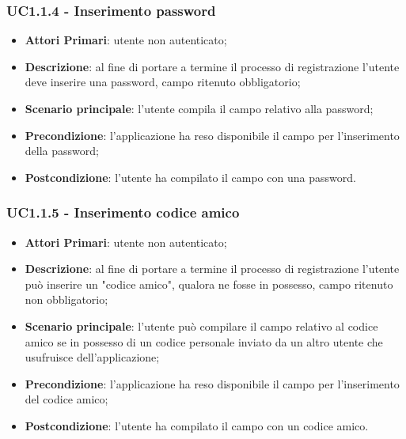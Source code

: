 \subsubsection{UC1.1.4 - Inserimento password}
\begin{itemize}
	\item \textbf{Attori Primari}: utente non autenticato;
	\item \textbf{Descrizione}: al fine di portare a termine il processo di registrazione l'utente deve inserire una password, campo ritenuto obbligatorio;
	\item \textbf{Scenario principale}: l'utente compila il campo relativo alla password;	
	\item \textbf{Precondizione}: l'applicazione ha reso disponibile il campo per l'inserimento della password;
	\item \textbf{Postcondizione}: l'utente ha compilato il campo con una password.
\end{itemize}

\subsubsection{UC1.1.5 - Inserimento codice amico}
\begin{itemize}
	\item \textbf{Attori Primari}: utente non autenticato;
	\item \textbf{Descrizione}: al fine di portare a termine il processo di registrazione l'utente può inserire un "codice amico", qualora ne fosse in possesso, campo ritenuto non obbligatorio;
	\item \textbf{Scenario principale}: l'utente può compilare il campo relativo al codice amico se in possesso di un codice personale inviato da un altro utente che usufruisce dell'applicazione;	
	\item \textbf{Precondizione}: l'applicazione ha reso disponibile il campo per l'inserimento del codice amico;
	\item \textbf{Postcondizione}: l'utente ha compilato il campo con un codice amico.
\end{itemize}

